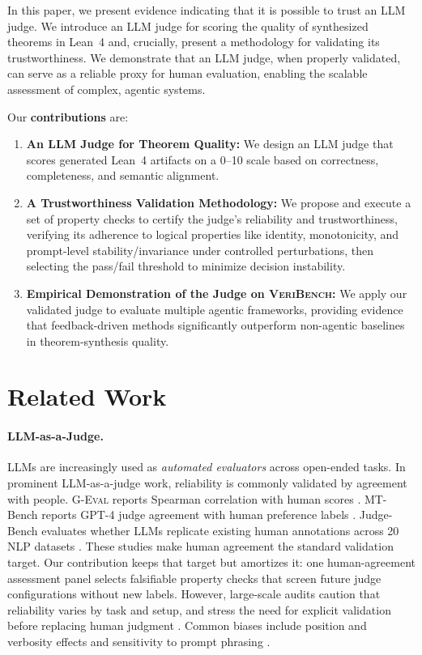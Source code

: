 \documentclass[numbers]{article}
\begin{document}
In this paper, we present evidence indicating that it is possible to trust an LLM judge. We introduce an LLM judge for scoring the quality of synthesized theorems in Lean~4 and, crucially, present a methodology for validating its trustworthiness. We demonstrate that an LLM judge, when properly validated, can serve as a reliable proxy for human evaluation, enabling the scalable assessment of complex, agentic systems.

Our \textbf{contributions} are:
\begin{enumerate}
  \item \textbf{An LLM Judge for Theorem Quality:} We design an LLM judge that scores generated Lean~4 artifacts on a 0--10 scale based on correctness, completeness, and semantic alignment.
  \item \textbf{A Trustworthiness Validation Methodology:} We propose and execute a set of property checks to certify the judge's reliability and trustworthiness, verifying its adherence to logical properties like identity, monotonicity, and prompt-level stability/invariance under controlled perturbations, then selecting the pass/fail threshold to minimize decision instability.
  \item \textbf{Empirical Demonstration of the Judge on \textsc{VeriBench}:} We apply our validated judge to evaluate multiple agentic frameworks, providing evidence that feedback-driven methods significantly outperform non-agentic baselines in theorem-synthesis quality.
\end{enumerate}

\section{Related Work}
\paragraph{LLM-as-a-Judge.}
LLMs are increasingly used as \emph{automated evaluators} across open-ended tasks.
In prominent LLM-as-a-judge work, reliability is commonly validated by agreement with people.
\textsc{G-Eval} reports Spearman correlation with human scores \citep{Liu2023GEval}.
MT-Bench reports GPT-4 judge agreement with human preference labels \citep{Zheng2023MTBench}.
Judge-Bench evaluates whether LLMs replicate existing human annotations across 20 NLP datasets \citep{Kocmi2024HumanVsLLM}.
These studies make human agreement the standard validation target.
Our contribution keeps that target but amortizes it: one human-agreement assessment panel selects falsifiable property checks that screen future judge configurations without new labels.
However, large-scale audits caution that reliability varies by task and setup, and stress the need for explicit validation before replacing human judgment \citep{Kocmi2024HumanVsLLM,Li2024TrustLLMJudgments}.
Common biases include position and verbosity effects and sensitivity to prompt phrasing \citep{Zheng2023MTBench,Li2024TrustLLMJudgments}.
\end{document}
